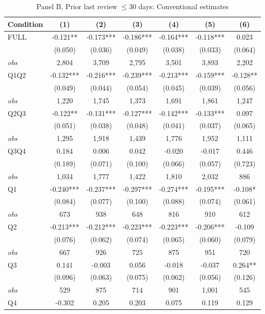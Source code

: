 \documentclass[11pt]{article}
\begin{document}
\begin{table}[!htbp]
\centering
\caption{Panel B, Prior last review $\leq 30$ days: Conventional estimates}
\label{tab:trim00:b:prior_last_review_le30d}
\small
\begin{tabular}{lcccccc}
\toprule
Condition & (1) & (2) & (3) & (4) & (5) & (6) \\
\midrule
FULL & -0.121** & -0.173*** & -0.186*** & -0.164*** & -0.118*** & 0.023 \\
 & (0.050) & (0.036) & (0.049) & (0.038) & (0.033) & (0.064) \\
\textit{obs} & 2,804 & 3,709 & 2,795 & 3,501 & 3,893 & 2,202 \\
Q1Q2 & -0.132*** & -0.216*** & -0.239*** & -0.213*** & -0.159*** & -0.128** \\
 & (0.049) & (0.044) & (0.054) & (0.045) & (0.039) & (0.056) \\
\textit{obs} & 1,220 & 1,745 & 1,373 & 1,691 & 1,861 & 1,247 \\
Q2Q3 & -0.122** & -0.131*** & -0.127*** & -0.142*** & -0.133*** & 0.097 \\
 & (0.051) & (0.038) & (0.048) & (0.041) & (0.037) & (0.065) \\
\textit{obs} & 1,295 & 1,918 & 1,439 & 1,776 & 1,952 & 1,111 \\
Q3Q4 & 0.184 & 0.006 & 0.042 & -0.020 & -0.017 & 0.446 \\
 & (0.189) & (0.071) & (0.100) & (0.066) & (0.057) & (0.723) \\
\textit{obs} & 1,034 & 1,777 & 1,422 & 1,810 & 2,032 &   886 \\
Q1 & -0.240*** & -0.237*** & -0.297*** & -0.274*** & -0.195*** & -0.108* \\
 & (0.084) & (0.077) & (0.100) & (0.088) & (0.074) & (0.061) \\
\textit{obs} & 673 & 938 & 648 & 816 & 910 & 612 \\
Q2 & -0.213*** & -0.212*** & -0.223*** & -0.223*** & -0.206*** & -0.109 \\
 & (0.076) & (0.062) & (0.074) & (0.065) & (0.060) & (0.079) \\
\textit{obs} & 667 & 926 & 725 & 875 & 951 & 720 \\
Q3 & 0.141 & -0.003 & 0.056 & -0.018 & -0.037 & 0.264** \\
 & (0.096) & (0.063) & (0.075) & (0.062) & (0.056) & (0.126) \\
\textit{obs} &   529 &   875 &   714 &   901 & 1,001 &   545 \\
Q4 & -0.302 & 0.205 & 0.203 & 0.075 & 0.119 & 0.129 \\

\end{tabular}
\end{table}
\end{document}
